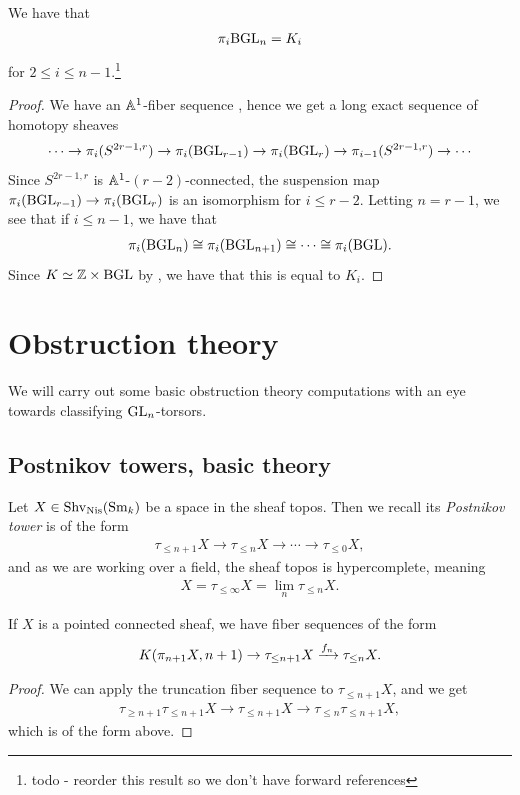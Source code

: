 \documentclass[11pt,openany]{book}
\begin{document}
\begin{corollary}
We have that
\begin{align*}
    \pi_i \mathrm{BGL}_n = K_i
\end{align*}
for $2\le i\le n-1$.\footnote{todo - reorder this result so we don't have forward references}
\end{corollary}
\begin{proof} We have an $\mathbb{A}^1$-fiber sequence , hence we get a long exact sequence of homotopy sheaves
\begin{align*}
    \cdots \to \pi_i(S^{2r-1,r}) \to \pi_i(\mathrm{BGL}_{r-1}) \to \pi_i (\mathrm{BGL}_r) \to \pi_{i-1}(S^{2r-1,r}) \to \cdots 
\end{align*}
Since $S^{2r-1,r}$ is $\mathbb{A}^1$-$(r-2)$-connected, the suspension map $\pi_i(\mathrm{BGL}_{r-1}) \to \pi_{i}(\mathrm{BGL}_{r})$ is an isomorphism for $i\le r-2$. Letting $n = r-1$, we see that if $i\le n-1$, we have that
\begin{align*}
    \pi_i(\mathrm{BGL}_n) \cong \pi_i(\mathrm{BGL}_{n+1}) \cong \cdots \cong \pi_i(\mathrm{BGL}).
\end{align*}
Since $K \simeq \mathbb{Z} \times \mathrm{BGL}$ by , we have that this is equal to $K_i$.
\end{proof}


\section{Obstruction theory}

We will carry out some basic obstruction theory computations with an eye towards classifying $\mathrm{GL}_n$-torsors. 

\subsection{Postnikov towers, basic theory}

Let $X \in \mathrm{Shv}_{\mathrm{Nis}}(\mathrm{Sm}_k)$ be a space in the sheaf topos. Then we recall its \textit{Postnikov tower} is of the form
\begin{align*}
    \tau_{\le n+1} X\to \tau_{\le n} X\to \cdots \to \tau_{\le 0}X,
\end{align*}
and as we are working over a field, the sheaf topos is hypercomplete, meaning
\begin{align*}
    X = \tau_{\le \infty} X = \lim_n \tau_{\le n} X.
\end{align*}
%
\begin{proposition} If $X$ is a pointed connected sheaf, we have fiber sequences of the form
\begin{align*}
    K(\pi_{n+1} X, n+1) \to \tau_{\le n+1} X \xrightarrow{f_n} \tau_{\le n} X.
\end{align*}
\end{proposition}
\begin{proof} We can apply the truncation fiber sequence to $\tau_{\le n+1} X$, and we get
\begin{align*}
    \tau_{\ge n+1} \tau_{\le n+1}X \to \tau_{\le n+1} X \to \tau_{\le n} \tau_{\le n+1} X,
\end{align*}
which is of the form above.
\end{proof}
\end{document}
